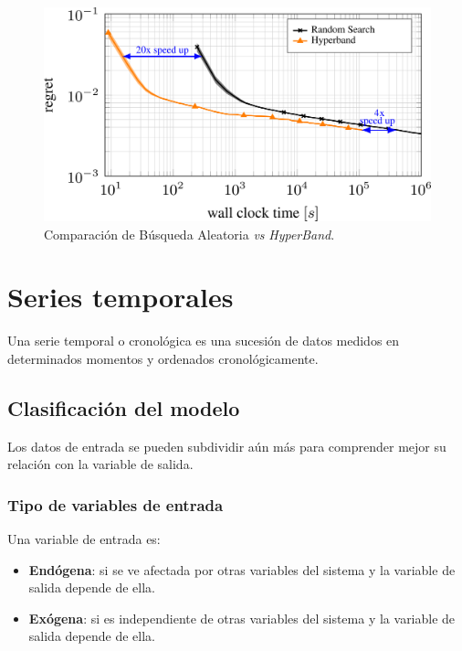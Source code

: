 \documentclass[a4paper,12pt]{article}
\begin{document}
\begin{figure}[H]
	\begin{center}
		\includegraphics[width=1\textwidth]{comparison_rs_hb.png}
		\caption{Comparación de Búsqueda Aleatoria \textit{vs} \textit{HyperBand}.\citep{automl-bohb}}
		\label{fig:rs_vs_hb}
	\end{center}
\end{figure}

\section{Series temporales}

Una serie temporal o cronológica es una sucesión de datos medidos en determinados momentos y ordenados cronológicamente. \citep{Agrawal2019Mar}

\subsection{Clasificación del modelo}

Los datos de entrada se pueden subdividir aún más para comprender mejor su relación con la variable de salida.

\subsubsection{Tipo de variables de entrada}

Una variable de entrada es:
\begin{itemize}[noitemsep, topsep=2pt]
	\item \textbf{Endógena}: si se ve afectada por otras variables del sistema y la variable de salida depende de ella.
	\item \textbf{Exógena}: si es independiente de otras variables del sistema y la variable de salida depende de ella.
\end{itemize}
\end{document}

